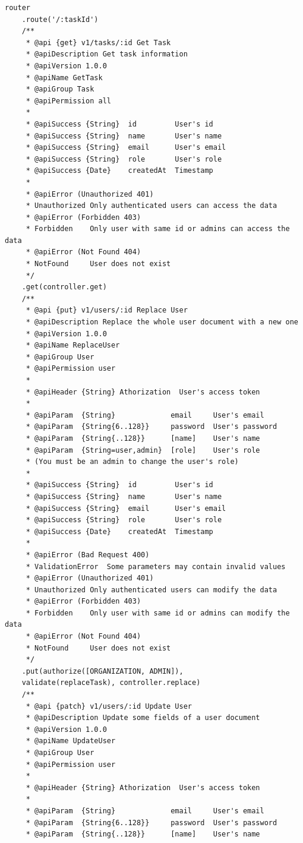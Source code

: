 \documentclass[12pt]{article}
\begin{document}
\begin{verbatim}
router
    .route('/:taskId')
    /**
     * @api {get} v1/tasks/:id Get Task
     * @apiDescription Get task information
     * @apiVersion 1.0.0
     * @apiName GetTask
     * @apiGroup Task
     * @apiPermission all
     *
     * @apiSuccess {String}  id         User's id
     * @apiSuccess {String}  name       User's name
     * @apiSuccess {String}  email      User's email
     * @apiSuccess {String}  role       User's role
     * @apiSuccess {Date}    createdAt  Timestamp
     *
     * @apiError (Unauthorized 401) 
     * Unauthorized Only authenticated users can access the data
     * @apiError (Forbidden 403)    
     * Forbidden    Only user with same id or admins can access the data
     * @apiError (Not Found 404)    
     * NotFound     User does not exist
     */
    .get(controller.get)
    /**
     * @api {put} v1/users/:id Replace User
     * @apiDescription Replace the whole user document with a new one
     * @apiVersion 1.0.0
     * @apiName ReplaceUser
     * @apiGroup User
     * @apiPermission user
     *
     * @apiHeader {String} Athorization  User's access token
     *
     * @apiParam  {String}             email     User's email
     * @apiParam  {String{6..128}}     password  User's password
     * @apiParam  {String{..128}}      [name]    User's name
     * @apiParam  {String=user,admin}  [role]    User's role
     * (You must be an admin to change the user's role)
     *
     * @apiSuccess {String}  id         User's id
     * @apiSuccess {String}  name       User's name
     * @apiSuccess {String}  email      User's email
     * @apiSuccess {String}  role       User's role
     * @apiSuccess {Date}    createdAt  Timestamp
     *
     * @apiError (Bad Request 400)  
     * ValidationError  Some parameters may contain invalid values
     * @apiError (Unauthorized 401) 
     * Unauthorized Only authenticated users can modify the data
     * @apiError (Forbidden 403)    
     * Forbidden    Only user with same id or admins can modify the data
     * @apiError (Not Found 404)    
     * NotFound     User does not exist
     */
    .put(authorize([ORGANIZATION, ADMIN]), 
    validate(replaceTask), controller.replace)
    /**
     * @api {patch} v1/users/:id Update User
     * @apiDescription Update some fields of a user document
     * @apiVersion 1.0.0
     * @apiName UpdateUser
     * @apiGroup User
     * @apiPermission user
     *
     * @apiHeader {String} Athorization  User's access token
     *
     * @apiParam  {String}             email     User's email
     * @apiParam  {String{6..128}}     password  User's password
     * @apiParam  {String{..128}}      [name]    User's name

\end{verbatim}
\end{document}
